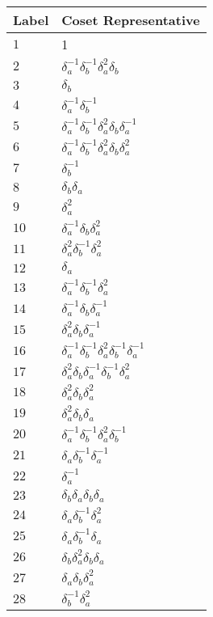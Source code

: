 \documentclass{article}
\begin{document}
\begin{center}
\begin{tabular}{ll}
\toprule
Label & Coset Representative\\
\midrule
$1$ & 1 \\
$2$ & $\delta_a^{-1}\delta_b^{-1}\delta_a^{2}\delta_b^{}$ \\
$3$ & $\delta_b^{}$ \\
$4$ & $\delta_a^{-1}\delta_b^{-1}$ \\
$5$ & $\delta_a^{-1}\delta_b^{-1}\delta_a^{2}\delta_b^{}\delta_a^{-1}$ \\
$6$ & $\delta_a^{-1}\delta_b^{-1}\delta_a^{2}\delta_b^{}\delta_a^{2}$ \\
$7$ & $\delta_b^{-1}$ \\
$8$ & $\delta_b^{}\delta_a^{}$ \\
$9$ & $\delta_a^{2}$ \\
$10$ & $\delta_a^{-1}\delta_b^{}\delta_a^{2}$ \\
$11$ & $\delta_a^{2}\delta_b^{-1}\delta_a^{2}$ \\
$12$ & $\delta_a^{}$ \\
$13$ & $\delta_a^{-1}\delta_b^{-1}\delta_a^{2}$ \\
$14$ & $\delta_a^{-1}\delta_b^{}\delta_a^{-1}$ \\
$15$ & $\delta_a^{2}\delta_b^{}\delta_a^{-1}$ \\
$16$ & $\delta_a^{-1}\delta_b^{-1}\delta_a^{2}\delta_b^{-1}\delta_a^{-1}$ \\
$17$ & $\delta_a^{2}\delta_b^{}\delta_a^{-1}\delta_b^{-1}\delta_a^{2}$ \\
$18$ & $\delta_a^{2}\delta_b^{}\delta_a^{2}$ \\
$19$ & $\delta_a^{2}\delta_b^{}\delta_a^{}$ \\
$20$ & $\delta_a^{-1}\delta_b^{-1}\delta_a^{2}\delta_b^{-1}$ \\
$21$ & $\delta_a^{}\delta_b^{-1}\delta_a^{-1}$ \\
$22$ & $\delta_a^{-1}$ \\
$23$ & $\delta_b^{}\delta_a^{}\delta_b^{}\delta_a^{}$ \\
$24$ & $\delta_a^{}\delta_b^{-1}\delta_a^{2}$ \\
$25$ & $\delta_a^{}\delta_b^{-1}\delta_a^{}$ \\
$26$ & $\delta_b^{}\delta_a^{2}\delta_b^{}\delta_a^{}$ \\
$27$ & $\delta_a^{}\delta_b^{}\delta_a^{2}$ \\
$28$ & $\delta_b^{-1}\delta_a^{2}$ \\

\end{tabular}
\end{center}
\end{document}
